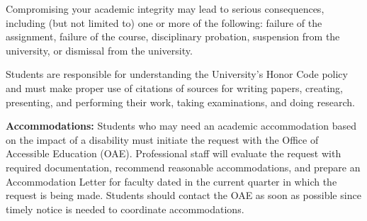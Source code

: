 \documentclass[11pt,letterpaper]{article}
\begin{document}
Compromising your academic integrity may lead to serious consequences, including (but not limited to) one or more of the following: failure of the assignment, failure of the course, disciplinary probation, suspension from the university, or dismissal from the university.

Students are responsible for understanding the University's Honor Code policy and must make proper use of citations of sources for writing papers, creating, presenting, and performing their work, taking examinations, and doing research.

\medskip
\noindent
\textbf{Accommodations:} Students who may need an academic accommodation based on the impact of a disability must initiate the request with the Office of Accessible Education (OAE). Professional staff will evaluate the request with required documentation, recommend reasonable accommodations, and prepare an Accommodation Letter for faculty dated in the current quarter in which the request is being made. Students should contact the OAE as soon as possible since timely notice is needed to coordinate accommodations.
\end{document}
